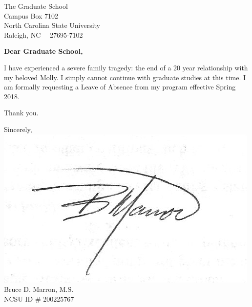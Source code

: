 \documentclass[11pt]{letter} %
\begin{document}

\begin{letter}{The Graduate School \\
 Campus Box 7102\\
 North Carolina State University \\
 Raleigh, NC ~~27695-7102} %


\opening{\textbf{Dear Graduate School,}}

I have experienced a severe family tragedy: the end of a 20 year relationship with my beloved Molly. I simply cannot continue with graduate studies at this time. I am formally requesting a Leave of Absence from my program effective Spring 2018.

Thank you. 

\vspace{2\parskip} %
\closing{Sincerely,\\
\includegraphics[scale=.7]{graphics/signature.jpeg}\\
Bruce D. Marron, M.S.\\
NCSU ID \# 200225767
}




\end{letter}
 
\end{document}
